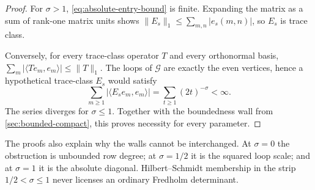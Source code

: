 \begin{proof}
For $\sigma>1$, \eqref{eq:absolute-entry-bound} is finite.  Expanding the
matrix as a sum of rank-one matrix units shows
$\|E_s\|_1\leq\sum_{m,n}|e_s(m,n)|$, so $E_s$ is trace class.

Conversely, for every trace-class operator $T$ and every orthonormal basis,
$\sum_m|\langle Te_m,e_m\rangle|\leq\|T\|_1$.  The loops of
$\mathcal G$ are exactly the even vertices, hence a hypothetical
trace-class $E_s$ would satisfy
\begin{equation}
 \sum_{m\geq1}|\langle E_se_m,e_m\rangle|
 =\sum_{t\geq1}(2t)^{-\sigma}<\infty.
 \label{eq:diagonal-obstruction}
\end{equation}
The series diverges for $\sigma\leq1$.  Together with the boundedness wall
from \cref{sec:bounded-compact}, this proves necessity for every parameter.
\end{proof}

\FigurePhaseDiagram
\TableTheoremPhase

The proofs also explain why the walls cannot be interchanged.  At
$\sigma=0$ the obstruction is unbounded row degree; at $\sigma=1/2$ it is
the squared loop scale; and at $\sigma=1$ it is the absolute diagonal.
Hilbert--Schmidt membership in the strip $1/2<\sigma\leq1$ never licenses an
ordinary Fredholm determinant.

